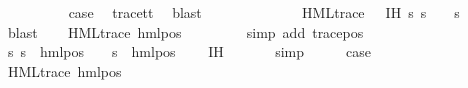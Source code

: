 \begin{isabellebody}
\ \ \isamarkupfalse%
\ {}\isanewline
\ \ \isamarkupfalse%
\ \isamarkupfalse%
\ {\isacharquery}{\kern0pt}case\ \isamarkupfalse%
\ trace{\isacharunderscore}{\kern0pt}tt\ \isamarkupfalse%
\ blast\isanewline
{}\isamarkupfalse%
\isanewline
\ \ \isamarkupfalse%
\ {\isacharparenleft}{\kern0pt}{}\ {\isasymphi}\ {\isasymalpha}{\isacharparenright}{\kern0pt}\isanewline
\ \ \isamarkupfalse%
\ \isamarkupfalse%
\ {\isasympsi}\ \ {\isachardoublequoteopen}HML{\isacharunderscore}{\kern0pt}trace\ {\isasympsi}{\isachardoublequoteclose}\ \ IH{\isacharcolon}{\kern0pt}\ {\isachardoublequoteopen}{\isacharparenleft}{\kern0pt}{\isasymforall}s{\isachardot}{\kern0pt}\ {\isacharparenleft}{\kern0pt}s\ {\isasymTurnstile}\ {\isasymphi}{\isacharparenright}{\kern0pt}\ {\isacharequal}{\kern0pt}\ {\isacharparenleft}{\kern0pt}s\ {\isasymTurnstile}\ {\isasympsi}{\isacharparenright}{\kern0pt}{\isacharparenright}{\kern0pt}{\isachardoublequoteclose}\ \isamarkupfalse%
\ blast\isanewline
\ \ \isamarkupfalse%
\ {\isachardoublequoteopen}HML{\isacharunderscore}{\kern0pt}trace\ {\isacharparenleft}{\kern0pt}hml{\isacharunderscore}{\kern0pt}pos\ {\isasymalpha}\ {\isasympsi}{\isacharparenright}{\kern0pt}{\isachardoublequoteclose}\ \isanewline
\ \ \ \ \isamarkupfalse%
\ {\isacharparenleft}{\kern0pt}simp\ add{\isacharcolon}{\kern0pt}\ trace{\isacharunderscore}{\kern0pt}pos{\isacharparenright}{\kern0pt}\isanewline
\ \ \isamarkupfalse%
\ {\isachardoublequoteopen}{\isacharparenleft}{\kern0pt}{\isasymforall}s{\isachardot}{\kern0pt}\ {\isacharparenleft}{\kern0pt}s\ {\isasymTurnstile}\ hml{\isacharunderscore}{\kern0pt}pos\ {\isasymalpha}\ {\isasymphi}{\isacharparenright}{\kern0pt}\ {\isacharequal}{\kern0pt}\ {\isacharparenleft}{\kern0pt}s\ {\isasymTurnstile}\ {\isacharparenleft}{\kern0pt}hml{\isacharunderscore}{\kern0pt}pos\ {\isasymalpha}\ {\isasympsi}{\isacharparenright}{\kern0pt}{\isacharparenright}{\kern0pt}{\isacharparenright}{\kern0pt}{\isachardoublequoteclose}\ \isamarkupfalse%
\ IH\ \isanewline
\ \ \ \ \isamarkupfalse%
\ simp\isanewline
\ \ \isamarkupfalse%
\ \isamarkupfalse%
\ {\isacharquery}{\kern0pt}case\ \isanewline
\ \ \ \ \isamarkupfalse%
\ {\isacartoucheopen}HML{\isacharunderscore}{\kern0pt}trace\ {\isacharparenleft}{\kern0pt}hml{\isacharunderscore}{\kern0pt}pos\ {\isasymalpha}\ {\isasympsi}{\isacharparenright}{\kern0pt}{\isacartoucheclose}\ \isamarkupfalse%

\end{isabellebody}
